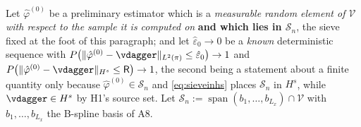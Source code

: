 \begin{definition}\label{def:lfstep}
Let $\hat\varphi^{(0)}$ be a preliminary estimator which is a \emph{measurable random element of
$\mathcal V$ with respect to the sample it is computed on} \textbf{and which lies in $\mathcal S_n$}, the
sieve fixed at the foot of this paragraph; and let $\hat\varepsilon_0\to0$ be a \emph{known}
deterministic sequence with
$P\big(\|\hat\varphi^{(0)}-\vdagger\|_{L^{2}(\pi)}\le\hat\varepsilon_0\big)\to1$ and
$P\big(\|\hat\varphi^{(0)}-\vdagger\|_{H^{s}}\le\mathsf R\big)\to1$, the second being a statement about
a finite quantity only because $\hat\varphi^{(0)}\in\mathcal S_n$ and \eqref{eq:sieveinhs} places
$\mathcal S_n$ in $H^{s}$, while $\vdagger\in H^{s}$ by H1's source set.
Let
$\mathcal S_n:=\operatorname{span}(b_1,\dots,b_{L_x})\cap\mathcal V$ with $b_1,\dots,b_{L_x}$
the B-spline basis of A8.


\end{definition}
